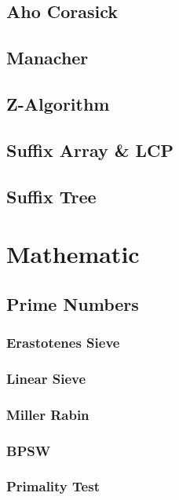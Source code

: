 \documentclass[10pt,a4paper]{report}
\begin{document}
	\section{Aho Corasick}
		
	\section{Manacher}
	\section{Z-Algorithm}
	\newpage
	\section{Suffix Array \& LCP}
		
	\section{Suffix Tree}
	
\chapter{Mathematic}
	\section{Prime Numbers}
		\subsection{Erastotenes Sieve}
		\newpage
		\subsection{Linear Sieve}
			
		\newpage
		\subsection{Miller Rabin}
			
		\newpage
		\subsection{BPSW}
			
		\newpage
		\subsection{Primality Test}
			
		\newpage
\end{document}
